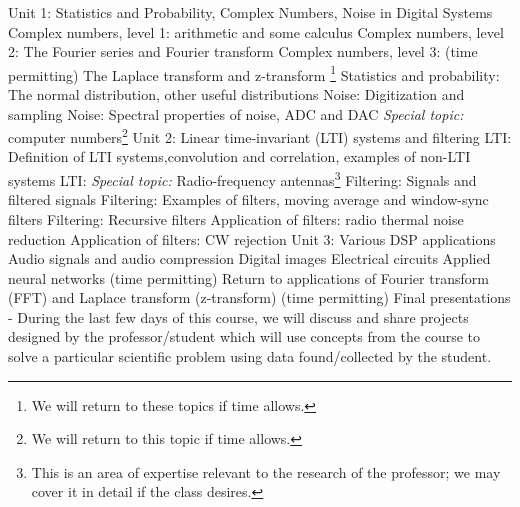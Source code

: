 \documentclass[10pt]{article}
\begin{document}
\begin{outline}[enumerate]
\1 Unit 1: Statistics and Probability, Complex Numbers, Noise in Digital Systems
\2 Complex numbers, level 1: arithmetic and some calculus
\2 Complex numbers, level 2: The Fourier series and Fourier transform
\2 Complex numbers, level 3: (time permitting) The Laplace transform and z-transform \footnote{We will return to these topics if time allows.}
\2 Statistics and probability: The normal distribution, other useful distributions
\2 Noise: Digitization and sampling
\2 Noise: Spectral properties of noise, ADC and DAC
\2 \textit{Special topic:} computer numbers\footnote{We will return to this topic if time allows.}
\1 Unit 2: Linear time-invariant (LTI) systems and filtering
\2 LTI: Definition of LTI systems,convolution and correlation, examples of non-LTI systems
\2 LTI: \textit{Special topic:} Radio-frequency antennas\footnote{This is an area of expertise relevant to the research of the professor; we may cover it in detail if the class desires.}
\2 Filtering: Signals and filtered signals
\2 Filtering: Examples of filters, moving average and window-sync filters
\2 Filtering: Recursive filters
\2 Application of filters: radio thermal noise reduction
\2 Application of filters: CW rejection
\1 Unit 3: Various DSP applications
\2 Audio signals and audio compression
\2 Digital images
\2 Electrical circuits
\2 Applied neural networks (time permitting)
\2 Return to applications of Fourier transform (FFT) and Laplace transform (z-transform) (time permitting)
\1 Final presentations - During the last few days of this course, we will discuss and share projects designed by the professor/student which will use concepts from the course to solve a particular scientific problem using data found/collected by the student.
\end{outline}
\end{document}
